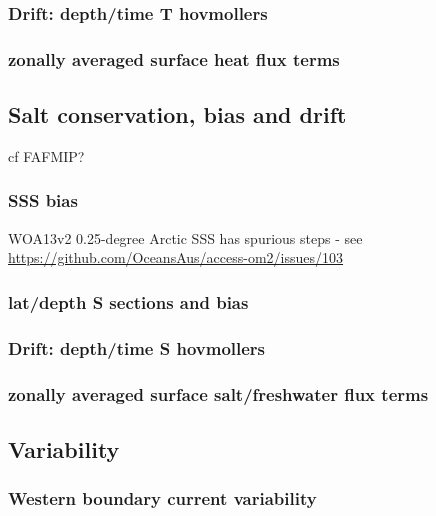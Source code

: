 \documentclass[11pt]{article}
\begin{document}
\subsubsection{Drift: depth/time T hovmollers}
\subsubsection{zonally averaged surface heat flux terms}

\subsection{Salt conservation, bias and drift}
cf FAFMIP? \citet{GregoryETAL2016a}
\subsubsection{SSS bias}
WOA13v2 0.25-degree Arctic SSS has spurious steps - see \url{https://github.com/OceansAus/access-om2/issues/103}
\subsubsection{lat/depth S sections and bias}
\subsubsection{Drift: depth/time S hovmollers}
\subsubsection{zonally averaged surface salt/freshwater flux terms}

\subsection{Variability}
\citet{DanabasogluYeagerKimBehrensBentsenBiBiastochBleckBoning2016a}
\subsubsection{Western boundary current variability}
\end{document}

